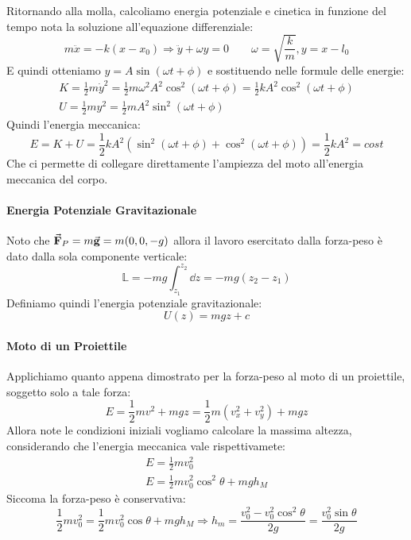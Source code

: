 \documentclass{article}
\newcommand{\then}{\ensuremath{\Rightarrow}}
\newcommand{\g}{\va{g}}
\newcommand{\F}{\va{F}}
\begin{document}
Ritornando alla molla, calcoliamo energia potenziale e cinetica in funzione del tempo nota la soluzione all'equazione differenziale:
\[m\ddot{x}=-k(x-x_0)\then \ddot{y}+\omega y=0\quad\quad \omega=\sqrt{\frac{k}{m}}, y=x-l_0\]
E quindi otteniamo $y=A\sin(\omega t+\phi)$ e sostituendo nelle formule delle energie:
\begin{align*}
    K=\frac{1}{2}m\dot{y}^2=\frac{1}{2}m\omega^2 A^2\cos^2(\omega t+\phi)=\frac{1}{2}kA^2\cos^2(\omega t+\phi)\\
    U=\frac{1}{2}my^2=\frac{1}{2}mA^2\sin^2(\omega t+\phi)
\end{align*}
Quindi l'energia meccanica:
\[E=K+U=\frac{1}{2}kA^2\left(\sin^2(\omega t+\phi)+\cos^2(\omega t+\phi)\right)=\boxed{\frac{1}{2}kA^2}=cost\]
Che ci permette di collegare direttamente l'ampiezza del moto all'energia meccanica del corpo.

\paragraph{Energia Potenziale Gravitazionale}
Noto che $\F_P=m\g=m(0,0,-g)$ allora il lavoro esercitato dalla forza-peso è dato dalla sola componente verticale:
\[\mathbb{L}=-mg\int_{z_1}^{z_2}\dd z=-mg(z_2-z_1)\]
Definiamo quindi l'energia potenziale gravitazionale:
\[U(z)=mgz+c\]
\paragraph{Moto di un Proiettile}
Applichiamo quanto appena dimostrato per la forza-peso al moto di un proiettile, soggetto solo a tale forza:
\[E=\frac{1}{2}mv^2+mgz=\frac{1}{2}m(v_x^2+v_y^2)+mgz\]
Allora note le condizioni iniziali vogliamo calcolare la massima altezza, considerando che l'energia meccanica vale rispettivamete:
\begin{align*}
    E=\frac{1}{2}mv_0^2\\
    E=\frac{1}{2}mv_0^2\cos^2\theta+mgh_M
\end{align*}
Siccoma la forza-peso è conservativa:
\[\frac{1}{2}mv_0^2=\frac{1}{2}mv_0^2\cos\theta+mgh_M\then h_m=\frac{v_0^2-v_0^2\cos^2\theta}{2g}=\frac{v_0^2\sin\theta}{2g}\]
\end{document}

